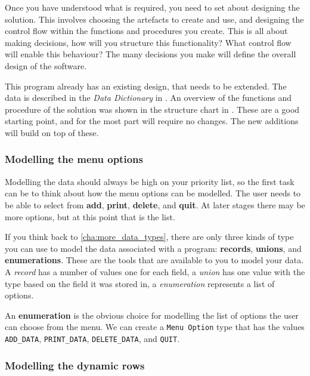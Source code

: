 Once you have understood what is required, you need to set about designing the solution. This involves choosing the artefacts to create and use, and designing the control flow within the functions and procedures you create. This is all about making decisions, how will you structure this functionality? What control flow will enable this behaviour? The many decisions you make will define the overall design of the software.

This program already has an existing design, that needs to be extended. The data is described in the \emph{Data Dictionary} in . An overview of the functions and procedure of the solution was shown in the structure chart in . These are a good starting point, and for the most part will require no changes. The new additions will build on top of these.

\subsubsection{Modelling the menu options} %
\label{ssub:modelling_the_menu_options}

Modelling the data should always be high on your priority list, so the first task can be to think about how the menu options can be modelled. The user needs to be able to select from \textbf{add}, \textbf{print}, \textbf{delete}, and \textbf{quit}. At later stages there may be more options, but at this point that is the list. 

If you think back to \cref{cha:more_data_types}, there are only three kinds of type you can use to model the data associated with a program: \textbf{records}, \textbf{unions}, and \textbf{enumerations}. These are the tools that are available to you to model your data. A \emph{record} has a number of values one for each field, a \emph{union} has one value with the type based on the field it was stored in, a \emph{enumeration} represents a list of options.

An \textbf{enumeration} is the obvious choice for modelling the list of options the user can choose from the menu. We can create a \texttt{Menu Option} type that has the values \texttt{ADD\_DATA}, \texttt{PRINT\_DATA}, \texttt{DELETE\_DATA}, and \texttt{QUIT}.


\subsubsection{Modelling the dynamic rows} %
\label{ssub:modelling_the_dynamic_rows}

